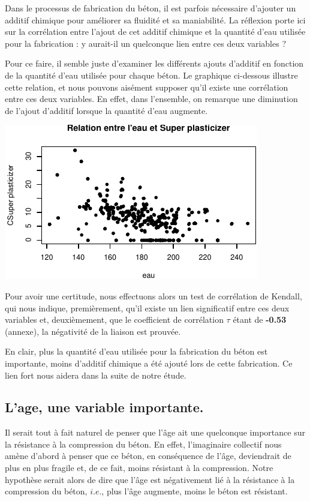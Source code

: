 \documentclass[
  12pt,
]{article}
\begin{document}
Dans le processus de fabrication du béton, il est parfois nécessaire
d'ajouter un additif chimique pour améliorer sa fluidité et sa
maniabilité. La réflexion porte ici sur la corrélation entre l'ajout de
cet additif chimique et la quantité d'eau utilisée pour la fabrication :
y aurait-il un quelconque lien entre ces deux variables ?

Pour ce faire, il semble juste d'examiner les différents ajouts
d'additif en fonction de la quantité d'eau utilisée pour chaque béton.
Le graphique ci-dessous illustre cette relation, et nous pouvons
aisément supposer qu'il existe une corrélation entre ces deux variables.
En effet, dans l'ensemble, on remarque une diminution de l'ajout
d'additif lorsque la quantité d'eau augmente.

\begin{center}\includegraphics{rmd_final_files/figure-latex/unnamed-chunk-10-1} \end{center}

Pour avoir une certitude, nous effectuons alors un test de corrélation
de Kendall, qui nous indique, premièrement, qu'il existe un lien
significatif entre ces deux variables et, deuxièmement, que le
coefficient de corrélation \(\tau\) étant de \textbf{-0.53} (annexe), la
négativité de la liaison est prouvée.

En clair, plus la quantité d'eau utilisée pour la fabrication du béton
est importante, moins d'additif chimique a été ajouté lors de cette
fabrication. Ce lien fort nous aidera dans la suite de notre étude.

\subsection{L'age, une variable
importante.}\label{lage-une-variable-importante.}

Il serait tout à fait naturel de penser que l'âge ait une quelconque
importance sur la résistance à la compression du béton. En effet,
l'imaginaire collectif nous amène d'abord à penser que ce béton, en
conséquence de l'âge, deviendrait de plus en plus fragile et, de ce
fait, moins résistant à la compression. Notre hypothèse serait alors de
dire que l'âge est négativement lié à la résistance à la compression du
béton, \(i.e.\), plus l'âge augmente, moins le béton est résistant.
\end{document}
